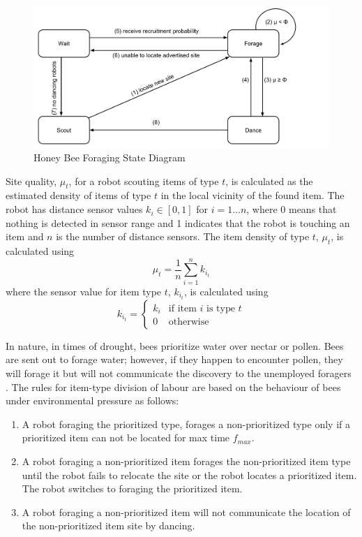 \begin{figure}[h]
	\centering
	\includegraphics[width=\textwidth]{chapters/chapter3/figures/HoneyBee.pdf}
	\caption{Honey Bee Foraging State Diagram }
	\label{honeybeestate}
\end{figure}

Site quality, $\mu_t$, for a robot scouting items of type $t$, is calculated as the estimated density of items of type $t$ in the local vicinity of the found item. The robot has distance sensor values $k_i\in[0,1]$ for $ i = 1...n$, where 0 means that nothing is detected in sensor range and 1 indicates that the robot is touching an item and $n$ is the number of distance sensors. The item density of type $t$, $\mu_t$, is calculated using
\begin{equation}
\label{density}
\mu_t = \frac{1}{n}\sum\limits_{i=1}^n k_{i_t}
\end{equation}
where the sensor value for item type $t$, $k_{i_t}$, is calculated using 
\begin{equation}
\label{densitytype}
k_{i_t}=
    \begin{cases}
      k_i & \text{if item $i$ is type $t$} \\
      0 & \text{otherwise}
    \end{cases}
\end{equation}

In nature, in times of drought, bees prioritize water over nectar or pollen. Bees are sent out to forage water; however, if they happen to encounter pollen, they will forage it but will not communicate the discovery to the unemployed foragers  \cite{seeley2009wisdom}. The rules for item-type division of labour are based on the behaviour of bees under environmental pressure as follows:

\begin{enumerate}
\item A robot foraging the prioritized type, forages a non-prioritized type only if a prioritized item can not be located for max time $f_{max}$.
\item A robot foraging a non-prioritized item forages the non-prioritized item type until the robot fails to relocate the site or the robot locates a prioritized item. The robot switches to foraging the prioritized item.
\item A robot foraging a non-prioritized item will not communicate the location of the non-prioritized item site by dancing. 
\end{enumerate}

